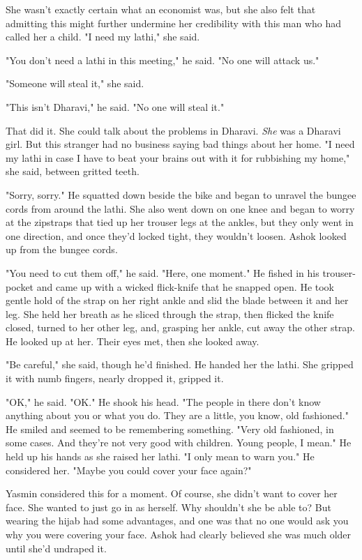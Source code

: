 She wasn't exactly certain what an economist was, but she also felt
that admitting this might further undermine her credibility with
this man who had called her a child. "I need my lathi," she said.

"You don't need a lathi in this meeting," he said. "No one will
attack us."

"Someone will steal it," she said.

"This isn't Dharavi," he said. "No one will steal it."

That did it. She could talk about the problems in Dharavi.
\emph{She} was a Dharavi girl. But this stranger had no business
saying bad things about her home. "I need my lathi in case I have
to beat your brains out with it for rubbishing my home," she said,
between gritted teeth.

"Sorry, sorry." He squatted down beside the bike and began to
unravel the bungee cords from around the lathi. She also went down
on one knee and began to worry at the zipstraps that tied up her
trouser legs at the ankles, but they only went in one direction,
and once they'd locked tight, they wouldn't loosen. Ashok looked up
from the bungee cords.

"You need to cut them off," he said. "Here, one moment." He fished
in his trouser-pocket and came up with a wicked flick-knife that he
snapped open. He took gentle hold of the strap on her right ankle
and slid the blade between it and her leg. She held her breath as
he sliced through the strap, then flicked the knife closed, turned
to her other leg, and, grasping her ankle, cut away the other
strap. He looked up at her. Their eyes met, then she looked away.

"Be careful," she said, though he'd finished. He handed her the
lathi. She gripped it with numb fingers, nearly dropped it, gripped
it.

"OK," he said. "OK." He shook his head. "The people in there don't
know anything about you or what you do. They are a little, you
know, old fashioned." He smiled and seemed to be remembering
something. "Very old fashioned, in some cases. And they're not very
good with children. Young people, I mean." He held up his hands as
she raised her lathi. "I only mean to warn you." He considered her.
"Maybe you could cover your face again?"

Yasmin considered this for a moment. Of course, she didn't want to
cover her face. She wanted to just go in as herself. Why shouldn't
she be able to? But wearing the hijab had some advantages, and one
was that no one would ask you why you were covering your face.
Ashok had clearly believed she was much older until she'd undraped
it.


